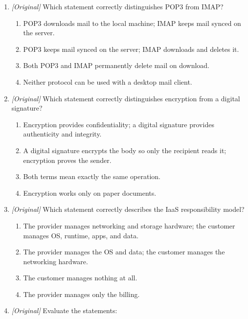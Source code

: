 \documentclass[11pt]{article}
\begin{document}
\begin{enumerate}[label=\textbf{Q\arabic*.}, leftmargin=*]
\begin{enumerate}[label=\Alph*.]
    \item Section Break
    \item Page Break
    \item Line Break
    \item Column Break
  \end{enumerate}
\item \textit{[Original]} Which statement correctly distinguishes POP3 from
  IMAP?
  \begin{enumerate}[label=\Alph*.]
    \item POP3 downloads mail to the local machine; IMAP keeps mail synced
      on the server.
    \item POP3 keeps mail synced on the server; IMAP downloads and deletes it.
    \item Both POP3 and IMAP permanently delete mail on download.
    \item Neither protocol can be used with a desktop mail client.
  \end{enumerate}
\item \textit{[Original]} Which statement correctly distinguishes encryption
  from a digital signature?
  \begin{enumerate}[label=\Alph*.]
    \item Encryption provides confidentiality; a digital signature provides
      authenticity and integrity.
    \item A digital signature encrypts the body so only the recipient reads
      it; encryption proves the sender.
    \item Both terms mean exactly the same operation.
    \item Encryption works only on paper documents.
  \end{enumerate}
\item \textit{[Original]} Which statement correctly describes the IaaS
  responsibility model?
  \begin{enumerate}[label=\Alph*.]
    \item The provider manages networking and storage hardware; the customer
      manages OS, runtime, apps, and data.
    \item The provider manages the OS and data; the customer manages the
      networking hardware.
    \item The customer manages nothing at all.
    \item The provider manages only the billing.
  \end{enumerate}
\item \textit{[Original]} Evaluate the statements:

\end{enumerate}
\end{document}
